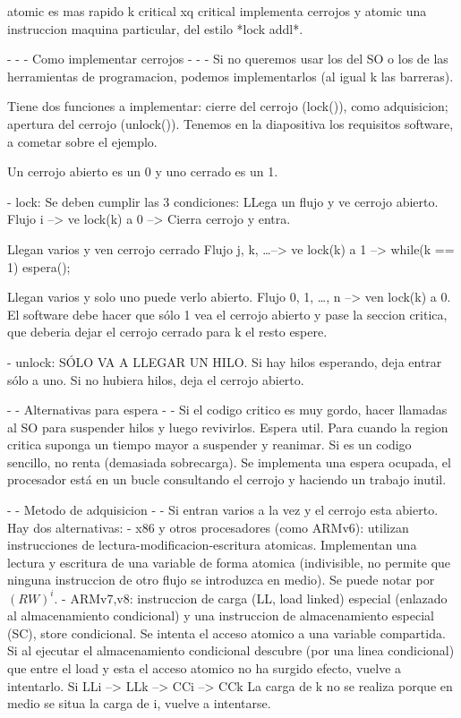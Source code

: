 atomic es mas rapido k critical xq critical implementa cerrojos y atomic una instruccion maquina particular, del estilo *lock addl*.

- - - Como implementar cerrojos - - -
Si no queremos usar los del SO o los de las herramientas de programacion, podemos implementarlos (al igual k las barreras).

Tiene dos funciones a implementar: cierre del cerrojo (lock()), como adquisicion; apertura del cerrojo (unlock()).
Tenemos en la diapositiva los requisitos software, a cometar sobre el ejemplo.

Un cerrojo abierto es un 0 y uno cerrado es un 1.

- lock: Se deben cumplir las 3 condiciones:
LLega un flujo y ve cerrojo abierto.
Flujo i --> ve lock(k) a 0 --> Cierra cerrojo y entra.

Llegan varios y ven cerrojo cerrado
Flujo j, k, \ldots --> ve lock(k) a 1 --> while(k == 1) espera(); 

Llegan varios y solo uno puede verlo abierto.
Flujo 0, 1, \ldots, n --> ven lock(k) a 0. 
El software debe hacer que sólo 1 vea el cerrojo abierto y pase la seccion critica, que deberia dejar el cerrojo cerrado para k el resto espere.

- unlock: SÓLO VA A LLEGAR UN HILO.
Si hay hilos esperando, deja entrar sólo a uno.
Si no hubiera hilos, deja el cerrojo abierto.

- - Alternativas para espera - -
Si el codigo critico es muy gordo, hacer llamadas al SO para suspender hilos y luego revivirlos. Espera util. Para cuando la region critica suponga un tiempo mayor a suspender y reanimar.
Si es un codigo sencillo, no renta (demasiada sobrecarga). Se implementa una espera ocupada, el procesador está en un bucle consultando el cerrojo y haciendo un trabajo inutil.


- - Metodo de adquisicion - -
Si entran varios a la vez y el cerrojo esta abierto.
Hay dos alternativas:
- x86 y otros procesadores (como ARMv6): utilizan instrucciones de lectura-modificacion-escritura atomicas. Implementan una lectura y escritura de una variable de forma atomica (indivisible, no permite que ninguna instruccion de otro flujo se introduzca en medio). Se puede notar por $(RW)^i$.
- ARMv7,v8: instruccion de carga (LL, load linked) especial (enlazado al almacenamiento condicional) y una instruccion de almacenamiento especial (SC), store condicional. Se intenta el acceso atomico a una variable compartida. Si al ejecutar el almacenamiento condicional descubre (por una linea condicional) que entre el load y esta el acceso atomico no ha surgido efecto, vuelve a intentarlo.
Si LLi --> LLk --> CCi --> CCk
La carga de k no se realiza porque en medio se situa la carga de i, vuelve a intentarse.

